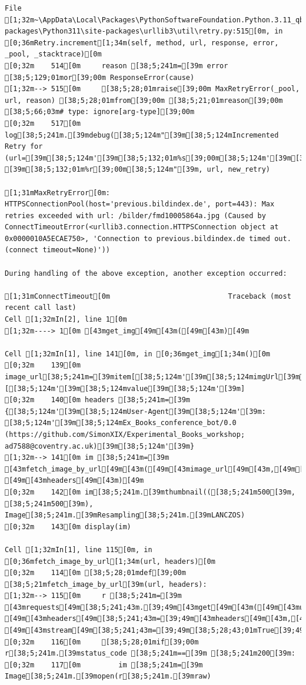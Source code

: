 \documentclass[
  letterpaper,
]{book}
\begin{document}
\begin{verbatim}
File [1;32m~\AppData\Local\Packages\PythonSoftwareFoundation.Python.3.11_qbz5n2kfra8p0\LocalCache\local-packages\Python311\site-packages\urllib3\util\retry.py:515[0m, in [0;36mRetry.increment[1;34m(self, method, url, response, error, _pool, _stacktrace)[0m
[0;32m    514[0m     reason [38;5;241m=[39m error [38;5;129;01mor[39;00m ResponseError(cause)
[1;32m--> 515[0m     [38;5;28;01mraise[39;00m MaxRetryError(_pool, url, reason) [38;5;28;01mfrom[39;00m [38;5;21;01mreason[39;00m  [38;5;66;03m# type: ignore[arg-type][39;00m
[0;32m    517[0m log[38;5;241m.[39mdebug([38;5;124m"[39m[38;5;124mIncremented Retry for (url=[39m[38;5;124m'[39m[38;5;132;01m%s[39;00m[38;5;124m'[39m[38;5;124m): [39m[38;5;132;01m%r[39;00m[38;5;124m"[39m, url, new_retry)

[1;31mMaxRetryError[0m: HTTPSConnectionPool(host='previous.bildindex.de', port=443): Max retries exceeded with url: /bilder/fmd10005864a.jpg (Caused by ConnectTimeoutError(<urllib3.connection.HTTPSConnection object at 0x0000010A5ECAE750>, 'Connection to previous.bildindex.de timed out. (connect timeout=None)'))

During handling of the above exception, another exception occurred:

[1;31mConnectTimeout[0m                            Traceback (most recent call last)
Cell [1;32mIn[2], line 1[0m
[1;32m----> 1[0m [43mget_img[49m[43m([49m[43m)[49m

Cell [1;32mIn[1], line 141[0m, in [0;36mget_img[1;34m()[0m
[0;32m    139[0m image_url[38;5;241m=[39mitem[[38;5;124m'[39m[38;5;124mimgUrl[39m[38;5;124m'[39m][[38;5;124m'[39m[38;5;124mvalue[39m[38;5;124m'[39m]
[0;32m    140[0m headers [38;5;241m=[39m {[38;5;124m'[39m[38;5;124mUser-Agent[39m[38;5;124m'[39m: [38;5;124m'[39m[38;5;124mEx_Books_conference_bot/0.0 (https://github.com/SimonXIX/Experimental_Books_workshop; ad7588@coventry.ac.uk)[39m[38;5;124m'[39m}
[1;32m--> 141[0m im [38;5;241m=[39m [43mfetch_image_by_url[49m[43m([49m[43mimage_url[49m[43m,[49m[43m [49m[43mheaders[49m[43m)[49m
[0;32m    142[0m im[38;5;241m.[39mthumbnail(([38;5;241m500[39m, [38;5;241m500[39m), Image[38;5;241m.[39mResampling[38;5;241m.[39mLANCZOS)
[0;32m    143[0m display(im)

Cell [1;32mIn[1], line 115[0m, in [0;36mfetch_image_by_url[1;34m(url, headers)[0m
[0;32m    114[0m [38;5;28;01mdef[39;00m [38;5;21mfetch_image_by_url[39m(url, headers):
[1;32m--> 115[0m     r [38;5;241m=[39m [43mrequests[49m[38;5;241;43m.[39;49m[43mget[49m[43m([49m[43murl[49m[43m,[49m[43m [49m[43mheaders[49m[38;5;241;43m=[39;49m[43mheaders[49m[43m,[49m[43m [49m[43mstream[49m[38;5;241;43m=[39;49m[38;5;28;43;01mTrue[39;49;00m[43m)[49m
[0;32m    116[0m     [38;5;28;01mif[39;00m r[38;5;241m.[39mstatus_code [38;5;241m==[39m [38;5;241m200[39m:
[0;32m    117[0m         im [38;5;241m=[39m Image[38;5;241m.[39mopen(r[38;5;241m.[39mraw)


\end{verbatim}
\end{document}

